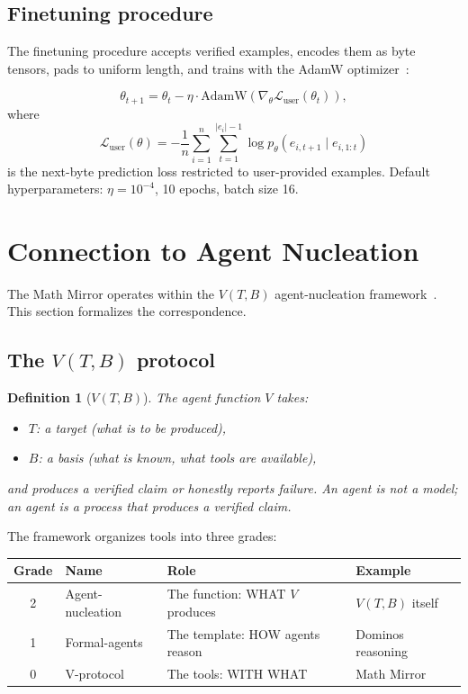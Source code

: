 \documentclass[11pt,a4paper]{article}
\newtheorem{definition}[theorem]{Definition}
\newcommand{\cL}{\mathcal{L}}
\begin{document}
\subsection{Finetuning procedure}

The finetuning procedure accepts verified examples, encodes
them as byte tensors, pads to uniform length, and trains
with the AdamW optimizer~\cite{Loshchilov2019}:

\begin{equation}\label{eq:finetune}
\theta_{t+1} = \theta_t - \eta \cdot \text{AdamW}\!\left(
  \nabla_\theta \cL_{\text{user}}(\theta_t)\right),
\end{equation}
where
\[
\cL_{\text{user}}(\theta) = -\frac{1}{n}\sum_{i=1}^{n}
  \sum_{t=1}^{|e_i|-1} \log p_\theta(e_{i,t+1} \mid e_{i,1:t})
\]
is the next-byte prediction loss restricted to user-provided examples.
Default hyperparameters: $\eta = 10^{-4}$, 10 epochs, batch size 16.

\section{Connection to Agent Nucleation}\label{sec:agent}

The Math Mirror operates within the $V(T, B)$ agent-nucleation
framework~\cite{Zhang2026Agent}.
This section formalizes the correspondence.

\subsection{The $V(T, B)$ protocol}

\begin{definition}[$V(T, B)$]\label{def:vtb}
The agent function $V$ takes:
\begin{itemize}[nosep]
\item $T$: a target (what is to be produced),
\item $B$: a basis (what is known, what tools are available),
\end{itemize}
and produces a verified claim or honestly reports failure.
An agent is not a model; an agent is a \emph{process that
produces a verified claim}.
\end{definition}

The framework organizes tools into three grades:

\begin{center}
\small
\renewcommand{\arraystretch}{1.1}
\begin{tabular}{@{}clll@{}}
\toprule
\textbf{Grade} & \textbf{Name} & \textbf{Role} & \textbf{Example} \\
\midrule
2 & Agent-nucleation & The function: WHAT $V$ produces & $V(T,B)$ itself \\
1 & Formal-agents & The template: HOW agents reason & Dominos reasoning \\
0 & V-protocol & The tools: WITH WHAT & Math Mirror \\
\bottomrule
\end{tabular}
\end{center}
\end{document}
